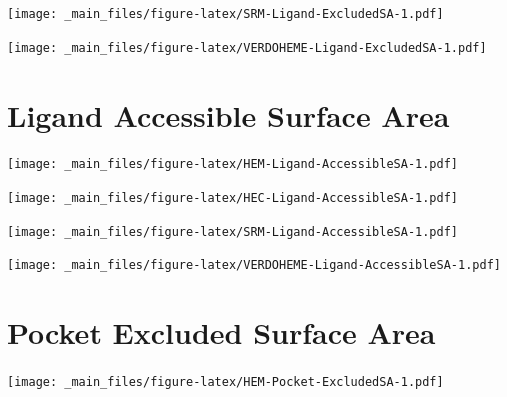 \documentclass[a4paper, nobind]{templates/ociamthesis}
\let\origfigure\figure
\let\endorigfigure\endfigure
\renewenvironment{figure}[1][2] {
    \expandafter\origfigure\expandafter[H]
} {
    \endorigfigure
}
\begin{document}
\begin{figure}
\centering
\texttt{[image: \_main\_files/figure-latex/SRM-Ligand-ExcludedSA-1.pdf]}
\caption{\label{fig:SRM-Ligand-ExcludedSA}SRM: Ligand Excluded Suface Area}
\end{figure}

\begin{figure}
\centering
\texttt{[image: \_main\_files/figure-latex/VERDOHEME-Ligand-ExcludedSA-1.pdf]}
\caption{\label{fig:VERDOHEME-Ligand-ExcludedSA}VERDOHEME: Ligand Excluded Suface Area}
\end{figure}

\hypertarget{figs-ligAccSA}{%
\section{Ligand Accessible Surface Area}\label{figs-ligAccSA}}

\begin{figure}
\centering
\texttt{[image: \_main\_files/figure-latex/HEM-Ligand-AccessibleSA-1.pdf]}
\caption{\label{fig:HEM-Ligand-AccessibleSA}HEM: Ligand Accessible Surface Area}
\end{figure}

\begin{figure}
\centering
\texttt{[image: \_main\_files/figure-latex/HEC-Ligand-AccessibleSA-1.pdf]}
\caption{\label{fig:HEC-Ligand-AccessibleSA}HEC: Ligand Accessible Surface Area}
\end{figure}

\begin{figure}
\centering
\texttt{[image: \_main\_files/figure-latex/SRM-Ligand-AccessibleSA-1.pdf]}
\caption{\label{fig:SRM-Ligand-AccessibleSA}SRM: Ligand Accessible Surface Area}
\end{figure}

\begin{figure}
\centering
\texttt{[image: \_main\_files/figure-latex/VERDOHEME-Ligand-AccessibleSA-1.pdf]}
\caption{\label{fig:VERDOHEME-Ligand-AccessibleSA}VERDOHEME: Ligand Accessible Surface Area}
\end{figure}

\hypertarget{figs-pocketExcSA}{%
\section{Pocket Excluded Surface Area}\label{figs-pocketExcSA}}

\begin{figure}
\centering
\texttt{[image: \_main\_files/figure-latex/HEM-Pocket-ExcludedSA-1.pdf]}
\caption{\label{fig:HEM-Pocket-ExcludedSA}HEM: Pocket Excluded Surface Area}
\end{figure}
\end{document}
